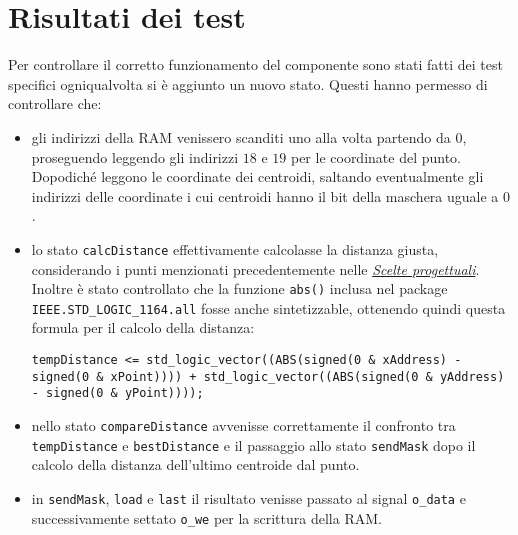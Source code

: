 \documentclass{article}
\begin{document}
\section{Risultati dei test}
Per controllare il corretto funzionamento del componente sono stati fatti dei test specifici ogniqualvolta si \`{e} aggiunto un nuovo stato. Questi hanno permesso di controllare che:
\begin{itemize}
	\item gli indirizzi della RAM venissero scanditi uno alla volta partendo da $0$, proseguendo leggendo gli indirizzi $18$ e $19$ per le coordinate del punto. Dopodich\'{e} leggono le coordinate dei centroidi, saltando eventualmente gli indirizzi delle coordinate i cui centroidi hanno il bit della maschera uguale a $0$.
	\item lo stato \texttt{calcDistance} effettivamente calcolasse la distanza giusta, considerando i punti menzionati precedentemente nelle \hyperref[sec:scelte]{\textit{Scelte progettuali}}. Inoltre \`{e} stato controllato che la funzione \texttt{abs()} inclusa nel package \texttt{IEEE.STD\_LOGIC\_1164.all} fosse anche sintetizzable, ottenendo quindi questa formula per il calcolo della distanza:
	\newline
	
	
	
	\texttt{tempDistance <= std\_logic\_vector((ABS(signed(\textsc{}0\textsc{} \& xAddress) - signed(\textsc{}0\textsc{} \& xPoint)))) + std\_logic\_vector((ABS(signed(\textsc{}0\textsc{} \& yAddress) - signed(\textsc{}0\textsc{} \& yPoint))));}
	
	\item nello stato \texttt{compareDistance} avvenisse correttamente il confronto tra \texttt{tempDistance} e \texttt{bestDistance} e il passaggio allo stato \texttt{sendMask} dopo il calcolo della distanza dell'ultimo centroide dal punto.
	\item in \texttt{sendMask}, \texttt{load} e \texttt{last} il risultato venisse passato al signal \texttt{o\_data} e successivamente settato \texttt{o\_we}  per la scrittura della RAM.
\end{itemize}
\end{document}
